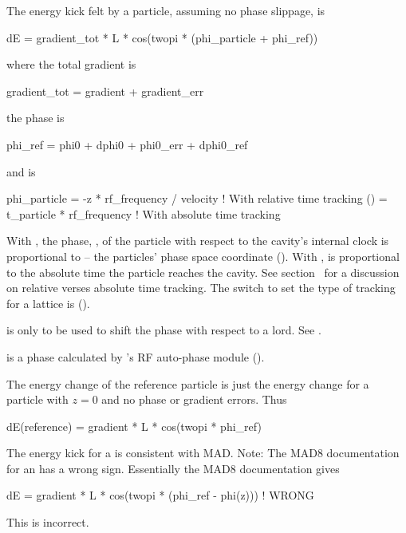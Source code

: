 The energy kick felt by a particle, assuming no phase slippage, is 
\begin{example}
  dE = gradient_tot * L * cos(twopi * (phi_particle + phi_ref))
\end{example}
where the total gradient is
\begin{example}
  gradient_tot = gradient + gradient_err
\end{example}
the phase  is
\begin{example}
  phi_ref = phi0 + dphi0 + phi0_err + dphi0_ref
\end{example}
and  is
\begin{example}
  phi_particle = -z * rf_frequency / velocity  ! With relative time tracking ()
               =  t_particle * rf_frequency    ! With absolute time tracking
\end{example}
With , the phase, , of the
particle with respect to the cavity's internal clock is proportional
to  -- the particles' phase space coordinate
(). With ,
 is proportional to the absolute time the particle
reaches the cavity. See section~ for a discussion on
relative verses absolute time tracking. The switch to set the type of
tracking for a lattice is 
().

 is only to be used to shift the phase with respect to a
 lord. See .

 is a phase calculated by \bmad's RF auto-phase module
().

The energy change of the reference particle is just the energy change for a 
particle with $z = 0$ and no phase or gradient errors. Thus
\begin{example}
  dE(reference) = gradient * L * cos(twopi * phi_ref)
\end{example}

The energy kick for a \bmad {} is consistent with MAD. 
Note: The MAD8 documentation for an  has a wrong
sign. Essentially the MAD8 documentation gives
\begin{example}
  dE = gradient * L * cos(twopi * (phi_ref - phi(z))) ! WRONG
\end{example}
This is incorrect. 

